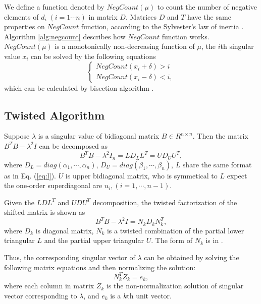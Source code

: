 We define a function denoted by $NegCount(\mu)$ to count the number of negative elements of $d_i\;(i=1\cdots n)$ in matrix $D$.
Matrices $D$ and $T$ have the same properties on $NegCount$ function, according to the Sylvester's law of inertia \cite{13sylvester}.
Algorithm \ref{alg:negcount} describes how $NegCount$ function works.
$NegCount(\mu)$ is a monotonically non-decreasing function of $\mu$, the $i$th singular value $x_i$ can be solved by the following equations
\begin{equation}
\left \{
\begin{aligned}
NegCount(x_i+\delta) > i \\
NegCount(x_i-\delta) < i ,
\end{aligned}
\right .
\label{eq:negcount}
\end{equation}
which can be calculated by bisection algorithm \cite{95ETNAbisecion}.


\subsection{Twisted Algorithm}
Suppose $\lambda$ is a singular value of bidiagonal matrix $B \in R^{n \times n}$.
Then the matrix $B^T B - \lambda^2 I$ can be decomposed as
\begin{equation}
B^T B - \lambda^2 I_n = L D_L L^T = U D_U U^T ,
\end{equation}
where $D_L=diag(\alpha_1, \cdots, \alpha_n)$, $D_U = diag(\beta_1, \cdots, \beta_n)$, 
$L$ share the same format as in Eq. (\ref{eq:l}).
$U$ is upper bidiagonal matrix, who is symmetical to $L$ expect the one-order superdiagonal are $u_{i}, (i=1,\cdots,n-1)$. 

Given the $LDL^T$ and $UDU^T$ decomposition, the twisted factorization of the shifted matrix is shown as
\begin{equation}
B^T B - \lambda^2 I = N_k D_k N_k^T ,
\label{eq:twisted}
\end{equation}
where $D_k$ is diagonal matrix, $N_k$ is a twisted combination of the partial lower triangular $L$ and the partial upper triangular $U$. The form of $N_k$ is in \cite{09NLAAtwisted}.

Thus, the corresponding singular vector of $\lambda$ can be obtained by solving the following matrix equations and then normalizing the solution:
\begin{equation}
N_k^T Z_k = e_k,
\label{eq:unnorm}
\end{equation}
 where each column in matrix $Z_k$ is the non-normalization solution of singular vector corresponding to $\lambda$, and $e_k$ is a $k$th unit vector.

